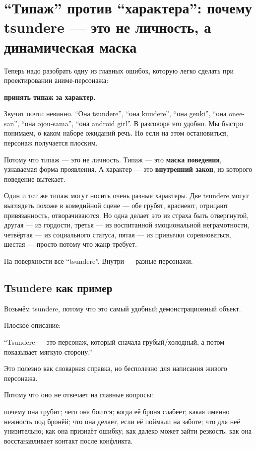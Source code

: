 \section{“Типаж” против “характера”: почему tsundere — это не личность, а динамическая маска}

Теперь надо разобрать одну из главных ошибок, которую легко сделать при
проектировании аниме-персонажа:

\textbf{принять типаж за характер.}

Звучит почти невинно. ``Она tsundere'', ``она kuudere'', ``она genki'',
``она onee-san'', ``она ojou-sama'', ``она android girl''. В разговоре
это удобно. Мы быстро понимаем, о каком наборе ожиданий речь. Но если на
этом остановиться, персонаж получается плоским.

Потому что типаж --- это не личность. Типаж --- это \textbf{маска
поведения}, узнаваемая форма проявления. А характер --- это
\textbf{внутренний закон}, из которого поведение вытекает.

Один и тот же типаж могут носить очень разные характеры. Две tsundere
могут выглядеть похоже в комедийной сцене --- обе грубят, краснеют,
отрицают привязанность, отворачиваются. Но одна делает это из страха
быть отвергнутой, другая --- из гордости, третья --- из воспитанной
эмоциональной неграмотности, четвёртая --- из социального статуса, пятая
--- из привычки соревноваться, шестая --- просто потому что жанр
требует.

На поверхности все ``tsundere''. Внутри --- разные персонажи.

\subsection*{Tsundere как пример}

Возьмём tsundere, потому что это самый удобный демонстрационный объект.

Плоское описание:

``Tsundere --- это персонаж, который сначала грубый/\hspace{0pt}холодный, а потом
показывает мягкую сторону.''

Это полезно как словарная справка, но бесполезно для написания живого
персонажа.

Потому что оно не отвечает на главные вопросы:

почему она грубит; чего она боится; когда её броня слабеет; какая именно
нежность под бронёй; что она делает, если её поймали на заботе; что для
неё унизительно; как она признаёт ошибку; как далеко может зайти
резкость; как она восстанавливает контакт после конфликта.

